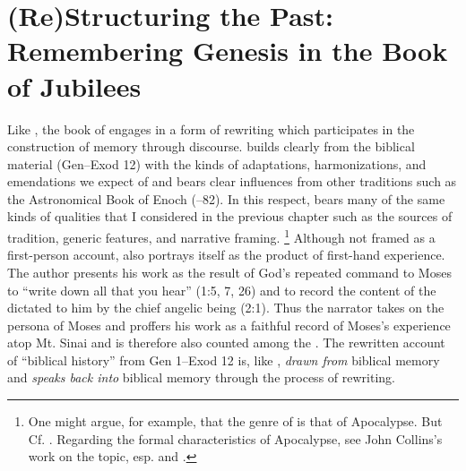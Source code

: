 
\nocite{dillamnn_jbw_kleine}
\nocite{ewald_zkm1844}

\chapter{(Re)Structuring the Past: Remembering Genesis in the Book of Jubilees}
\label{chap:jubilees}

Like \ga, the book of \jub engages in a form of rewriting which participates in the construction of memory through \psgraphical discourse. \jub builds clearly from the biblical material (Gen--Exod 12) with the kinds of adaptations, harmonizations, and emendations we expect of \rwb and bears clear influences from other \secondtemple traditions such as the Astronomical Book of Enoch (--82). In this respect, \jub bears many of the same kinds of qualities that I considered in the previous chapter such as the sources of tradition, generic features, and narrative framing.%
    \footnote{One might argue, for example, that the genre of \jub is that  of Apocalypse. But Cf. \cite{hanneken2012}. Regarding the formal characteristics of Apocalypse, see John Collins's work on the topic, esp. 
        \cite{collins_mason-etal2012} and 
        \cite{collins_semeia1979}.}
Although not framed as a first-person account, \jub also portrays itself as the product of first-hand experience. The author presents his work as the result of God's repeated command to Moses to ``write down all that you hear'' (1:5, 7, 26) and to record the content of the \heavenlytablets dictated to him by the chief angelic being (2:1). Thus the narrator takes on the persona of Moses and proffers his work as a faithful record of Moses's experience atop Mt. Sinai and is therefore also counted among the \psa. The rewritten account of ``biblical history'' from Gen 1--Exod 12 is, like \ga, \emph{drawn from} biblical memory and \emph{speaks back into} biblical memory through the process of rewriting. 

